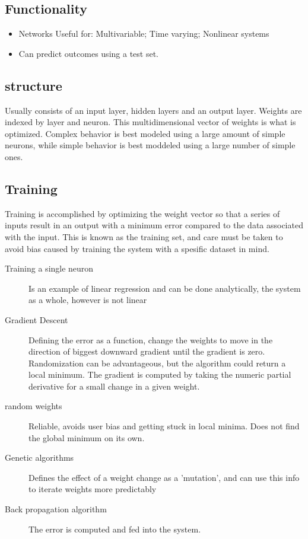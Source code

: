 \documentclass{report}
\begin{document}
\subsection{Functionality}
\begin{itemize}
	\item Networks Useful for:
		\subitem Multivariable; 
		\subitem Time varying;
		\subitem Nonlinear systems
	\item Can predict outcomes using a test set. 
\end{itemize}
\subsection{structure}
Usually consists of an input layer, hidden layers and an output layer. Weights are indexed by layer and neuron. This multidimensional vector of weights is what is optimized. 
Complex behavior is best modeled using a large amount of simple neurons, while simple behavior is best moddeled using a large number of simple ones. 
\subsection{Training}
Training is accomplished by optimizing the weight vector so that a series of inputs result in an output with a minimum error compared to the data associated with the input. This is known as the training set, and care must be taken to avoid bias caused by training the system with a spesific dataset in mind. 
\begin{description}
	\item[Training a single neuron] Is an example of linear regression and can be done analytically, the system as a whole, however is not linear
	\item[Gradient Descent] Defining the error as a function, change the weights to move in the direction of biggest downward gradient until the gradient is zero. Randomization can be advantageous, but the algorithm could return a local minimum. The gradient is computed by taking the numeric partial derivative for a small change in a given weight. 
	\item[random weights] Reliable, avoids user bias and getting stuck in local minima. Does not find the global minimum on its own.
	\item[Genetic algorithms] Defines the effect of a weight change as a 'mutation', and can use this info to iterate weights more predictably
	\item[Back propagation algorithm] The error is computed and fed into the system. 
\end{description}
\end{document}
